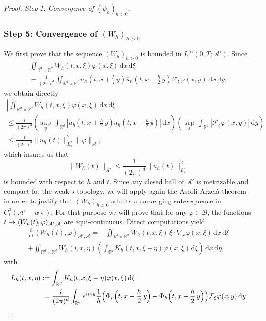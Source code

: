 \documentclass[11pt]{article}
\let\oldbar\bar\let\oldhat\hat\let\oldtilde\tilde
\newcommand\mto{\mathchoice{\longmapsto}{\mapsto}{\mapsto}{\mapsto}}
\let\bar\oldbar
\let\hat\oldhat
\let\tilde\oldtilde
\theoremstyle{definition}
\let\bar\overline
\let\hat\widehat
\let\tilde\widetilde
\newcommand{\R}{\mathbb{R}}
\newcommand{\ud}{\, {\mathrm{d}}}
\begin{document}
\begin{proof}[Proof. Step 1: Convergence of $(\psi_{h})_{h>0}$]
\subsubsection*{Step 5: Convergence of $(W_{h})_{h>0}$} We first prove that the sequence $(W_{h})_{h>0}$ is bounded in $L^{\infty}\left(0,T;\mathcal{A}'\right)$. Since
\begin{multline*}
\iint_{\R^{d}\times\R^{d}}W_{h}(t,x,\xi)\varphi(x,\xi)\ud x\ud \xi\\
=\frac{1}{(2\pi)^{d}}\iint_{\R^{d}\times\R^{d}}u_{h}(t,x+\frac{h}{2}\,y)\bar{u}_{h}(t,x-\frac{h}{2}\,y)\mathcal{F}_{\xi}\varphi(x,y)\ud x\ud y,
\end{multline*}
we obtain directly
\begin{multline*}
\left|\iint_{\R^{d}\times\R^{d}}W_{h}(t,x,\xi)\varphi(x,\xi)\ud x\ud \xi\right|\\
\leq\frac{1}{(2\pi)^{d}}\left(\underset{y}{\sup}\,\int_{\R^{d}}\left|u_{h}(t,x+\frac{h}{2}\,y)\bar{u}_{h}(t,x-\frac{h}{2}\,y)\right|\ud x\right)\left(\underset{x}{\sup}\,\int_{\R^{d}}|\mathcal{F}_{\xi}\varphi(x,y)|\ud y\right)\\
\leq\frac{1}{(2\pi)^{d}}\|u_{h}(t)\|_{L_{x}^{2}}^{2}\|\varphi\|_{\mathcal{A}},
\end{multline*}
which insures us that
\[
\|W_{h}(t)\|_{\mathcal{A}'}\leq\frac{1}{(2\pi)^{d}}\|u_{h}(t)\|_{L_{x}^{2}}^{2}
\]
is bounded with respect to $h$ and $t$. Since any closed ball of $\mathcal{A}'$ is metrizable and compact for the weak-$\star$ topology, we will apply again the Ascoli-Arzelà theorem in order to justify that $(W_{h})_{h>0}$ admits a converging sub-sequence in $C_{t}^{0}(\mathcal{A}'-w\star)$. For that purpose we will prove that for any $\varphi\in\mathcal{B}$, the functions $t\mto \langle W_{h}(t),\varphi\rangle_{\mathcal{A}',\mathcal{A}}$ are equi-continuous. Direct computations yield
\begin{multline}\label{eq_on_Wh}
\frac{\ud}{\ud t}\left\langle W_{h}(t),\varphi\right\rangle_{\mathcal{A}',\mathcal{A}}=-\iint_{\R^{d}\times\R^{d}}W_{h}(t,x,\xi)\,\xi\cdot\nabla_{x}\varphi(x,\xi)\ud x\ud\xi\\
+\iint_{\R^{d}\times\R^{d}}W_{h}(t,x,\eta)\left(\int_{\R^{d}}K_{h}(t,x,\xi-\eta)\varphi(x,\xi)\ud\xi\right)\ud x\ud\eta,
\end{multline}
with
\begin{align*}
L_{h}(t,x,\eta)&:=\int_{\R^{d}}K_{h}(t,x,\xi-\eta)\varphi(x,\xi)\ud\xi\\
&\hphantom{:}=\frac{i}{(2\pi)^{d}}\int_{\R^{d}}e^{i\eta\cdot y}\frac{1}{h}\Bigl(\Phi_{h}\Bigl(t,x+\frac{h}{2}\,y\Bigr)-\Phi_{h}\Bigl(t,x-\frac{h}{2}\,y\Bigr)\Bigr)\mathcal{F}_{\xi}\varphi(x,y)\ud y

\end{align*}
\end{proof}
\end{document}
